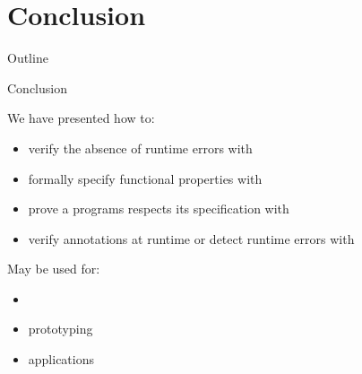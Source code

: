 
\section{Conclusion}

\begin{frame}{Outline}
\small
\tableofcontents[currentsection,subsectionstyle=show/shaded/hide]
\end{frame}
\begin{frame}{Conclusion}

  We have presented how to:
  \smallskip
  \begin{itemize}
  \item verify the absence of runtime errors with 
    \smallskip
  \item formally specify functional properties with 
    \smallskip
  \item prove a programs respects its specification with 
    \smallskip
  \item verify annotations at runtime or detect runtime errors with 
  \end{itemize}

  \begin{center}
    {\large {}}
    \medskip
  \end{center}

  May be used for:
  \begin{itemize}
  \smallskip
  \item {}
  \smallskip
  \item {} prototyping
  \smallskip
  \item {} applications
  \end{itemize}

  \begin{center}
    {\large {}}
  \end{center}

\end{frame}



